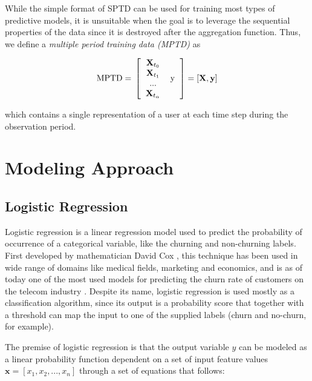 \documentclass{kththesis}
\begin{document}
While the simple format of SPTD can be used for training most types of predictive models, it is unsuitable when the goal is to leverage the sequential properties of the data since it is destroyed after the aggregation function. Thus, we define a \emph{multiple period training data (MPTD)} as

\begin{equation}
\text{MPTD} = \\
\left [  
  \begin{tabular}{c c}
   $\mathbf{X}_{t_0}$   & \multirow{4}{*}{y} \\
   $\mathbf{X}_{t_1}$ \\
   ... \\
  $\mathbf{X}_{t_\alpha}$ \\
  \end{tabular}
\right ]
= [\mathbf{X}, \mathbf{y}]
\end{equation}

which contains a single representation of a user at each time step during the observation period.

\section{Modeling Approach}

\subsection{Logistic Regression}

Logistic regression is a linear regression model used to predict the probability of occurrence of a categorical variable, like the churning and non-churning labels. First developed by mathematician David Cox \citep{cox1958regression}, this technique has been used in wide range of domains like medical fields, marketing and economics, and is as of today one of the most used models for predicting the churn rate of customers on the telecom industry \citep{mahajan2015review}. Despite its name, logistic regression is used mostly as a classification algorithm, since its output is a probability score that together with a threshold can map the input to one of the supplied labels (churn and no-churn, for example).

The premise of logistic regression is that the output variable $y$ can be modeled as a linear probability function dependent on a set of input feature values  $\mathbf{x} = [x_1, x_2, ..., x_n]$ through a set of equations that follows:
\end{document}
